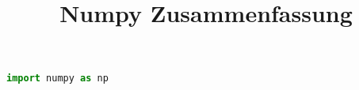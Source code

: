 \documentclass[12pt]{article}
\title{Numpy Zusammenfassung}
\begin{document}
\maketitle

\begin{lstlisting}[language=Python]
import numpy as np
\end{lstlisting}
\end{document}
